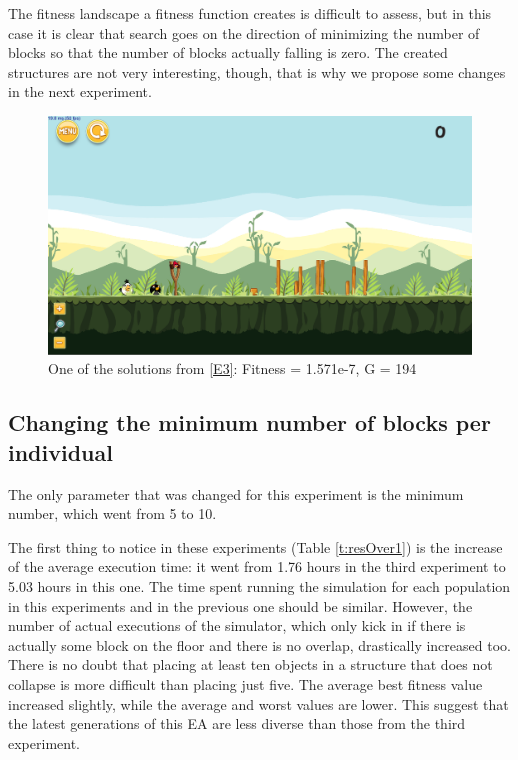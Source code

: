\documentclass[sigconf]{acmart}
\begin{document}
The fitness landscape a fitness function creates is difficult to
assess, but in this case it is clear that search goes on the direction
of minimizing the number of blocks so that the number of blocks
actually falling is zero. The created structures are not very
interesting, though, that is why we propose some changes in the next experiment.
\begin{figure}
	\centering
	\includegraphics[scale=0.2]{level-0-second_crossover180613_055622.png}
	\caption{One of the solutions from \ref{E3}: Fitness = 1.571e-7, G = 194  }\label{f:e3-4}
\end{figure}
\subsection{Changing the minimum number of blocks per individual}\label{E4}

The only parameter that was changed for this experiment is the minimum
number, which went from 5 to 10. 

The first thing to notice in these experiments (Table \ref{t:resOver1}) is the 
increase of the average execution time: it went from 1.76 hours in the third 
experiment to 5.03 hours in this one. The time spent running the simulation for 
each population in this experiments and in the previous one should be similar. 
However, the number of actual executions of the simulator, which only
kick in if there is actually some block on the floor and there is no overlap, drastically increased too. There is no doubt 
that placing at least ten objects in a structure that does not
collapse is more difficult than placing just five. The average 
best fitness value increased slightly, while the average and worst values are lower. This suggest that the latest generations of this EA are less diverse than those 
from the third experiment.
\end{document}
